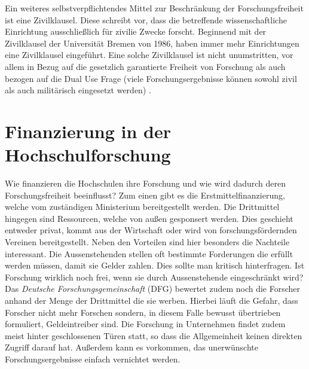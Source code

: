 \documentclass{pmwk}
\begin{document}
Ein weiteres selbstverpflichtendes Mittel zur Beschränkung der Forschungsfreiheit ist eine Zivilklausel. Diese schreibt vor, dass die betreffende wissenschaftliche Einrichtung ausschließlich für zivilie Zwecke forscht. Beginnend mit der Zivilklausel der Universität Bremen von 1986, haben immer mehr Einrichtungen eine Zivilklausel eingeführt. Eine solche Zivilklausel ist nicht unumstritten, vor allem in Bezug auf die gesetzlich garantierte Freiheit von Forschung als auch bezogen auf die Dual Use Frage (viele Forschungsergebnisse können sowohl zivil als auch militärisch eingesetzt werden) \cite{JKrause}. 

\section*{Finanzierung in der Hochschulforschung}
Wie finanzieren die Hochschulen ihre Forschung und wie wird dadurch deren Forschungsfreiheit beeinflusst? Zum einen gibt es die Erstmittelfinanzierung, welche vom zuständigen Ministerium bereitgestellt werden. Die Drittmittel hingegen sind Ressourcen, welche von außen gesponsert werden. Dies geschieht entweder privat, kommt aus der Wirtschaft oder wird von forschungsfördernden Vereinen bereitgestellt. Neben den Vorteilen sind hier besonders die Nachteile interessant. Die Aussenstehenden stellen oft bestimmte Forderungen die erfüllt werden müssen, damit sie Gelder zahlen. Dies sollte man kritisch hinterfragen. Ist Forschung wirklich noch frei, wenn sie durch Aussenstehende eingeschränkt wird? Das \textit{Deutsche Forschungsgemeinschaft} (DFG) bewertet zudem noch die Forscher anhand der Menge der Drittmittel die sie werben. Hierbei läuft die Gefahr, dass Forscher nicht mehr Forschen sondern, in diesem Falle bewusst übertrieben formuliert, Geldeintreiber sind.  Die Forschung in Unternehmen findet zudem meist hinter geschlossenen Türen statt, so dass die Allgemeinheit keinen direkten Zugriff darauf hat. Außerdem kann es vorkommen, das unerwünschte Forschungsergebnisse einfach vernichtet werden.
\end{document}
